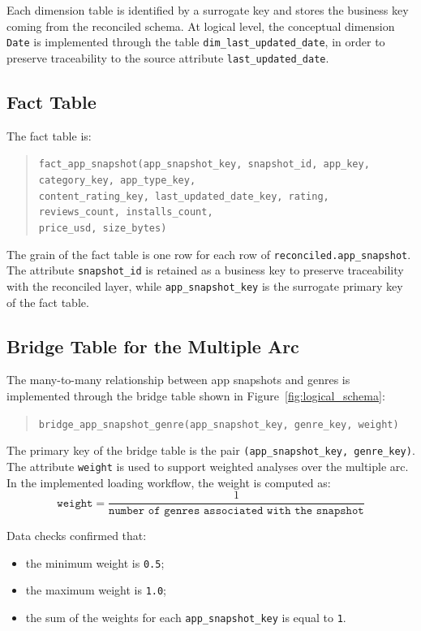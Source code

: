 \documentclass[11pt,a4paper]{article}
\begin{document}
Each dimension table is identified by a surrogate key and stores the business key coming from the reconciled schema. At logical level, the conceptual dimension \texttt{Date} is implemented through the table \texttt{dim\_last\_updated\_date}, in order to preserve traceability to the source attribute \texttt{last\_updated\_date}.

\subsection{Fact Table}
The fact table is:
\begin{quote}
\texttt{fact\_app\_snapshot(app\_snapshot\_key, snapshot\_id, app\_key, category\_key, app\_type\_key,} \\
\texttt{content\_rating\_key, last\_updated\_date\_key, rating, reviews\_count, installs\_count,} \\
\texttt{price\_usd, size\_bytes)}
\end{quote}

The grain of the fact table is one row for each row of \texttt{reconciled.app\_snapshot}. The attribute \texttt{snapshot\_id} is retained as a business key to preserve traceability with the reconciled layer, while \texttt{app\_snapshot\_key} is the surrogate primary key of the fact table.

\subsection{Bridge Table for the Multiple Arc}

The many-to-many relationship between app snapshots and genres is implemented through the bridge table shown in Figure~\ref{fig:logical_schema}:
\begin{quote}
\texttt{bridge\_app\_snapshot\_genre(app\_snapshot\_key, genre\_key, weight)}
\end{quote}

The primary key of the bridge table is the pair \texttt{(app\_snapshot\_key, genre\_key)}. The attribute \texttt{weight} is used to support weighted analyses over the multiple arc. In the implemented loading workflow, the weight is computed as:
\[
\texttt{weight} = \frac{1}{\texttt{number of genres associated with the snapshot}}
\]

Data checks confirmed that:
\begin{itemize}[leftmargin=1.5em]
    \item the minimum weight is \texttt{0.5};
    \item the maximum weight is \texttt{1.0};
    \item the sum of the weights for each \texttt{app\_snapshot\_key} is equal to \texttt{1}.
\end{itemize}
\end{document}
